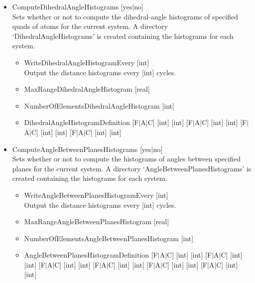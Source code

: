 \begin{itemize}
\item{ComputeDihedralAngleHistograms [yes$|$no]}\\
Sets whether or not to compute the dihedral-angle histograms of specified quads of atoms for the current system.
A directory `DihedralAngleHistograms' is created containing the histograms for each system.
\begin{itemize}
\item{WriteDihedralAngleHistogramEvery [int]}\\
Output the distance histograms every [int] cycles.
\item{MaxRangeDihedralAngleHistogram [real]}\\
\item{NumberOfElementsDihedralAngleHistogram [int]}\\
\item{DihedralAngleHistogramDefinition \small{[F$|$A$|$C] [int] [int] [F$|$A$|$C] [int] [int] [F$|$A$|$C] [int] [int] [F$|$A$|$C] [int] [int]}}\\
\end{itemize}

\item{ComputeAngleBetweenPlanesHistograms [yes$|$no]}\\
Sets whether or not to compute the histograms of angles between specified planes for the current system.
A directory `AngleBetweenPlanesHistograms' is created containing the histograms for each system.
\begin{itemize}
\item{WriteAngleBetweenPlanesHistogramEvery [int]}\\
Output the distance histograms every [int] cycles.
\item{MaxRangeAngleBetweenPlanesHistogram [real]}\\
\item{NumberOfElementsAngleBetweenPlanesHistogram [int]}\\
\item{AngleBetweenPlanesHistogramDefinition [F$|$A$|$C] [int] [int] [F$|$A$|$C] [int] [int] [F$|$A$|$C] [int] [int]
        [F$|$A$|$C] [int] [int] [F$|$A$|$C] [int] [int] [F$|$A$|$C] [int] [int]}\\
\end{itemize}



\end{itemize}
